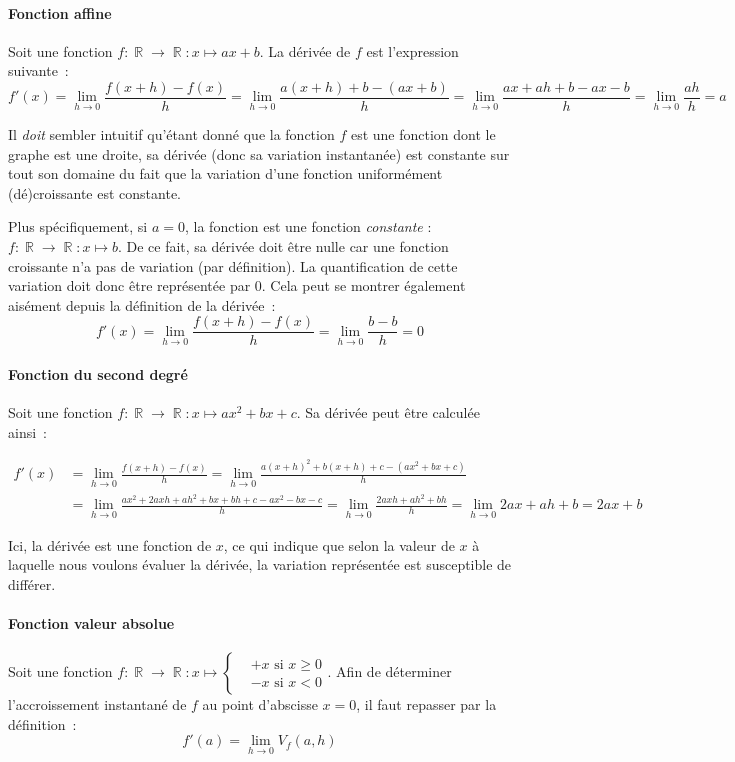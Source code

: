 \documentclass{article}
\DeclareMathOperator{\R}{\mathbb R}
\theoremstyle{definition}
\theoremstyle{remark}
\begin{document}
			\paragraph{Fonction affine}
				Soit une fonction $f : \R \to \R : x \mapsto ax + b$. La dérivée de $f$ est l'expression suivante~:
				\[f'(x) = \lim_{h \to 0}\frac {f(x + h) - f(x)}{h} = \lim_{h \to 0}\frac {a(x + h) + b - (ax + b)}{h} =
				  \lim_{h \to 0}\frac {ax + ah + b - ax - b}{h} = \lim_{h \to 0}\frac {ah}{h} = a\]

				Il \textit{doit} sembler intuitif qu'étant donné que la fonction $f$ est une fonction dont le graphe est une droite, sa
				dérivée (donc sa variation instantanée) est constante sur tout son domaine du fait que la variation d'une fonction uniformément
				(dé)croissante est constante.

				Plus spécifiquement, si $a = 0$, la fonction est une fonction \textit{constante} : $f : \R \to \R : x \mapsto b$.
				De ce fait, sa dérivée doit être nulle car une fonction croissante n'a pas de variation (par définition). La quantification de
				cette variation doit donc être représentée par 0. Cela peut se montrer également aisément depuis la définition de la dérivée~:
				\[f'(x) = \lim_{h \to 0}\frac {f(x+h) - f(x)}{h} = \lim_{h \to 0}\frac {b - b}{h} = 0\]

			\paragraph{Fonction du second degré}
				Soit une fonction $f : \R \to \R : x \mapsto ax^2 + bx + c$. Sa dérivée peut être calculée ainsi~:

				\[
					\begin{aligned}
						  f'(x) &= \lim_{h \to 0}\frac {f(x+h) - f(x)}{h} = \lim_{h \to 0}\frac {a(x+h)^2 + b(x+h) + c - (ax^2 + bx + c)}{h} \\ &=
						  \lim_{h \to 0}\frac {ax^2 + 2axh + ah^2 + bx + bh + c- ax^2 - bx - c}{h} = \lim_{h \to 0}\frac {2axh + ah^2 + bh}{h} =
						  \lim_{h \to 0} 2ax + ah + b = 2ax + b
					\end{aligned}
				\]

				Ici, la dérivée est une fonction de $x$, ce qui indique que selon la valeur de $x$ à laquelle nous voulons évaluer la
				dérivée, la variation représentée est susceptible de différer.

			\paragraph{Fonction valeur absolue}
				Soit une fonction $f : \R \to \R : x \mapsto \left\{\begin{aligned}&\text{$+x$ si $x \ge 0$} \\&\text{$-x$ si $x < 0$}\end{aligned}\right.$.
				Afin de déterminer l'accroissement instantané de $f$ au point d'abscisse $x=0$, il faut repasser par la définition~:
				\[f'(a) = \lim_{h \to 0}V_f(a, h)\]
\end{document}

